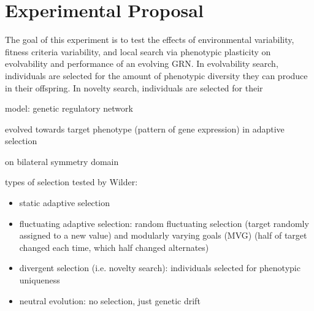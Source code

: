 \chapter{Experimental Proposal} \label{sec:experiment}
The goal of this experiment is to test the effects of environmental variability, fitness criteria variability, and local search via phenotypic plasticity on evolvability and performance of an evolving GRN. In evolvability search, individuals are selected for the amount of phenotypic diversity they can produce in their offspring. In novelty search, individuals are selected for their 

model: genetic regulatory network 

\cite{Wilder2015ReconcilingEvolvability} evolved towards target phenotype (pattern of gene expression) in adaptive selection

\cite{Reisinger2005TowardsEvolvability} on bilateral symmetry domain

types of selection tested by Wilder:
\begin{itemize}
  \item static adaptive selection
  \item fluctuating adaptive selection: random fluctuating selection (target randomly assigned to a new value) and modularly varying goals (MVG) (half of target changed each time, which half changed alternates)
  \item divergent selection (i.e. novelty search): individuals selected for phenotypic uniqueness
  \item neutral evolution: no selection, just genetic drift
\end{itemize}

